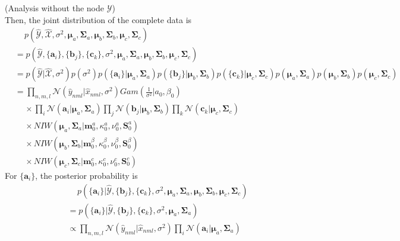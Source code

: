 \documentclass{article}
\newcommand{\bs}[1]{\boldsymbol{#1}}
\begin{document}
\begin{flushleft}
(Analysis without the node $\mathcal{Y}$)\\
Then, the joint distribution of the complete data is
\begin{equation}
	\begin{split}
		&\quad \, p(\mathcal{\hat{Y}}, \mathcal{\hat{X}},\sigma^2, \bs{\mu}_a, \bs{\Sigma}_a,\bs{\mu}_b, \bs{\Sigma}_b, \bs{\mu}_c, \bs{\Sigma}_c)\\ 
		&= p(\mathcal{\hat{Y}}, \{\bs{a}_i\},\{\bs{b}_j\},\{\bs{c}_k\}, \sigma^2, \bs{\mu}_a, \bs{\Sigma}_a,\bs{\mu}_b, \bs{\Sigma}_b, \bs{\mu}_c, \bs{\Sigma}_c)\\ 
		&=p(\mathcal{\hat{Y}}|\mathcal{\hat{X}}, \sigma^2)
		p(\sigma^2)p(\{\bs{a}_i\}|\bs{\mu}_a, \bs{\Sigma}_a)
		p(\{\bs{b}_j\}|\bs{\mu}_b, \bs{\Sigma}_b)
		p(\{\bs{c}_k\}|\bs{\mu}_c, \bs{\Sigma}_c)
		p(\bs{\mu}_a,\bs{\Sigma}_a)p(\bs{\mu}_b,\bs{\Sigma}_b)
		p(\bs{\mu}_c,\bs{\Sigma}_c)\\
		&=\prod_{n,m,l}\mathcal{N}(\hat{y}_{nml}|\hat{x}_{nml},\sigma^2)
		Gam(\frac{1}{\sigma^2}|a_0,\beta_0)\\
		&\quad \, \times
		\prod_i \mathcal{N}(\bs{a}_i|\bs{\mu}_a,\bs{\Sigma}_a)
		\prod_j \mathcal{N}(\bs{b}_j|\bs{\mu}_b,\bs{\Sigma}_b)
		\prod_k \mathcal{N}(\bs{c}_k|\bs{\mu}_c,\bs{\Sigma}_c)\\
		&\quad \, 
		\times NIW(\bs{\mu}_a, \bs{\Sigma}_a|\bs{m}^a_0,\kappa^a_0,\nu^a_0,\bs{S}^a_0)\\
		&\quad \, \times NIW(\bs{\mu}_b, \bs{\Sigma}_b|\bs{m}^\beta_0,\kappa^\beta_0,\nu^\beta_0,\bs{S}^\beta_0)\\
		&\quad \, \times NIW(\bs{\mu}_c, \bs{\Sigma}_c|\bs{m}^c_0,\kappa^c_0,\nu^c_0,\bs{S}^c_0)
	\end{split}
\end{equation}
For $\{\bs{a}_i\}$, the posterior probability is
\begin{equation}
\begin{split}
	&\quad \, p(\{\bs{a}_i\}|\mathcal{\hat{Y}},\{\bs{b}_j\},\{\bs{c}_k\},\sigma^2, \bs{\mu}_a, \bs{\Sigma}_a,\bs{\mu}_b, \bs{\Sigma}_b, \bs{\mu}_c, \bs{\Sigma}_c)\\
	&=p(\{\bs{a}_i\}|\mathcal{\hat{Y}},\{\bs{b}_j\},\{\bs{c}_k\},\sigma^2, \bs{\mu}_a, \bs{\Sigma}_a)\\
	&\propto 
	\prod_{n,m,l}\mathcal{N}(\hat{y}_{nml}|\hat{x}_{nml},\sigma^2) 
		\prod_i \mathcal{N}(\bs{a}_i|\bs{\mu}_a,\bs{\Sigma}_a)
\end{split}		
\end{equation}


\end{flushleft}
\end{document}
